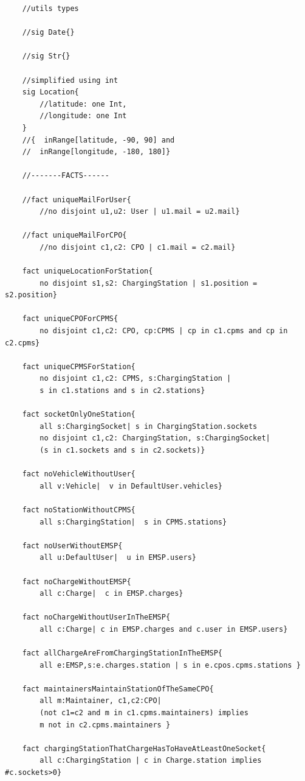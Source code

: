 \begin{verbatim}
    //utils types
    
    //sig Date{}
    
    //sig Str{}
    
    //simplified using int
    sig Location{  
        //latitude: one Int,   
        //longitude: one Int
    }
    //{  inRange[latitude, -90, 90] and   
    //	inRange[longitude, -180, 180]}
    
    //-------FACTS------
    
    //fact uniqueMailForUser{
        //no disjoint u1,u2: User | u1.mail = u2.mail}
    
    //fact uniqueMailForCPO{
        //no disjoint c1,c2: CPO | c1.mail = c2.mail}
    
    fact uniqueLocationForStation{
        no disjoint s1,s2: ChargingStation | s1.position = s2.position}
    
    fact uniqueCPOForCPMS{
        no disjoint c1,c2: CPO, cp:CPMS | cp in c1.cpms and cp in c2.cpms}
    
    fact uniqueCPMSForStation{
        no disjoint c1,c2: CPMS, s:ChargingStation | 
        s in c1.stations and s in c2.stations}
    
    fact socketOnlyOneStation{
        all s:ChargingSocket| s in ChargingStation.sockets
        no disjoint c1,c2: ChargingStation, s:ChargingSocket|
        (s in c1.sockets and s in c2.sockets)}
    
    fact noVehicleWithoutUser{
        all v:Vehicle|  v in DefaultUser.vehicles}
    
    fact noStationWithoutCPMS{
        all s:ChargingStation|  s in CPMS.stations}
    
    fact noUserWithoutEMSP{
        all u:DefaultUser|  u in EMSP.users}
    
    fact noChargeWithoutEMSP{
        all c:Charge|  c in EMSP.charges} 
    
    fact noChargeWithoutUserInTheEMSP{
        all c:Charge| c in EMSP.charges and c.user in EMSP.users}
    
    fact allChargeAreFromChargingStationInTheEMSP{
        all e:EMSP,s:e.charges.station | s in e.cpos.cpms.stations }
    
    fact maintainersMaintainStationOfTheSameCPO{
        all m:Maintainer, c1,c2:CPO|
        (not c1=c2 and m in c1.cpms.maintainers) implies 
        m not in c2.cpms.maintainers }
    
    fact chargingStationThatChargeHasToHaveAtLeastOneSocket{
        all c:ChargingStation | c in Charge.station implies #c.sockets>0}
        
\end{verbatim}

